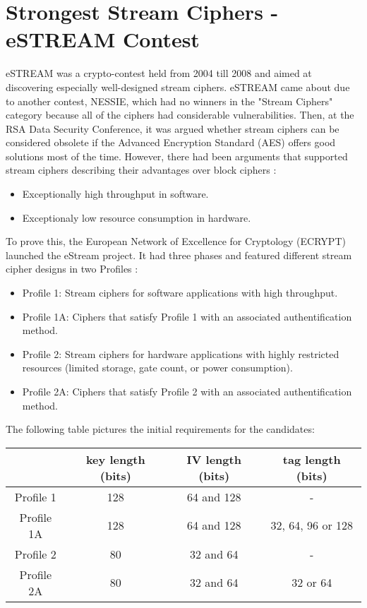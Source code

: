 	\section{Strongest Stream Ciphers - eSTREAM Contest}

eSTREAM was a crypto-contest held from 2004 till 2008 and aimed at discovering especially well-designed stream ciphers. eSTREAM came about due to another contest, NESSIE, which had no winners in the "Stream Ciphers" category because all of the ciphers had considerable vulnerabilities. Then, at the RSA Data Security Conference, it was argued whether stream ciphers can be considered obsolete if the Advanced Encryption Standard (AES) offers good solutions most of the time. However, there had been arguments that supported stream ciphers describing their advantages over block ciphers \cite{robshaw2008estream}:
\begin{itemize}
	\setlength\itemsep{0.1em}
	\item Exceptionally high throughput in software.
	\item Exceptionaly low resource consumption in hardware.
\end{itemize}
To prove this, the European Network of Excellence for Cryptology (ECRYPT) launched the eStream project. It had three phases and featured different stream cipher designs in two Profiles \cite{robshaw2008estream}:
\begin{itemize}
	\item[] Profile 1: Stream ciphers for software applications with high throughput.
	\item[] Profile 1A: Ciphers that satisfy Profile 1 with an associated authentification method.
	\item[] Profile 2: Stream ciphers for hardware applications with highly restricted resources (limited storage, gate count, or power consumption).
	\item[] Profile 2A: Ciphers that satisfy Profile 2 with an associated authentification method.
\end{itemize}

The following table pictures the initial requirements for the candidates:
\begin{table}[h!]
	\centering
	\begin{tabular}{| c c c c|} 
		\hline
		& key length (bits) & IV length (bits) & tag length (bits) \\ [0.5ex] 
		\hline
		Profile 1 & 128 & 64 and 128 & - \\ 
		Profile 1A & 128 & 64 and 128 & 32, 64, 96 or 128 \\
		Profile 2 & 80 & 32 and 64 & - \\
		Profile 2A & 80 & 32 and 64 & 32 or 64 \\[1ex] 
		\hline
	\end{tabular}
	\label{table:Initial requirements for the candidates}
\end{table}

